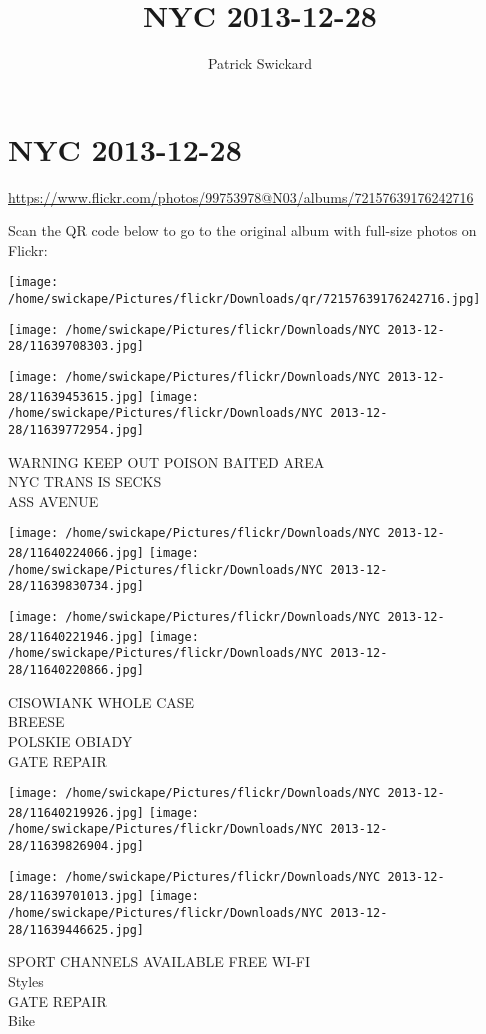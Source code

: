 \documentclass[10pt,letterpaper]{article}
\title{NYC 2013-12-28}
\author{Patrick Swickard}
\date{}
\begin{document}
\section*{NYC 2013-12-28}

\url{https://www.flickr.com/photos/99753978@N03/albums/72157639176242716}

Scan the QR code below to go to the original album with full-size photos on Flickr:

\texttt{[image: /home/swickape/Pictures/flickr/Downloads/qr/72157639176242716.jpg]}
\pagebreak

\texttt{[image: /home/swickape/Pictures/flickr/Downloads/NYC 2013-12-28/11639708303.jpg]}

\vspace{0.25in}
\texttt{[image: /home/swickape/Pictures/flickr/Downloads/NYC 2013-12-28/11639453615.jpg]}
\texttt{[image: /home/swickape/Pictures/flickr/Downloads/NYC 2013-12-28/11639772954.jpg]}

WARNING KEEP OUT POISON BAITED AREA\\
NYC TRANS IS SECKS\\
ASS AVENUE
\pagebreak

\texttt{[image: /home/swickape/Pictures/flickr/Downloads/NYC 2013-12-28/11640224066.jpg]}
\texttt{[image: /home/swickape/Pictures/flickr/Downloads/NYC 2013-12-28/11639830734.jpg]}

\texttt{[image: /home/swickape/Pictures/flickr/Downloads/NYC 2013-12-28/11640221946.jpg]}
\texttt{[image: /home/swickape/Pictures/flickr/Downloads/NYC 2013-12-28/11640220866.jpg]}

CISOWIANK WHOLE CASE\\
BREESE\\
POLSKIE OBIADY\\
GATE REPAIR
\pagebreak

\texttt{[image: /home/swickape/Pictures/flickr/Downloads/NYC 2013-12-28/11640219926.jpg]}
\texttt{[image: /home/swickape/Pictures/flickr/Downloads/NYC 2013-12-28/11639826904.jpg]}

\texttt{[image: /home/swickape/Pictures/flickr/Downloads/NYC 2013-12-28/11639701013.jpg]}
\texttt{[image: /home/swickape/Pictures/flickr/Downloads/NYC 2013-12-28/11639446625.jpg]}

SPORT CHANNELS AVAILABLE FREE WI{-}FI\\
Styles\\
GATE REPAIR\\
Bike
\pagebreak
\end{document}
